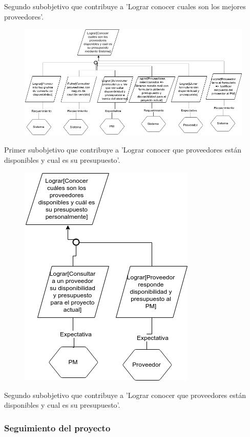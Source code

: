 Segundo subobjetivo que contribuye a 'Lograr conocer cuales son los mejores proveedores'.

\begin{figure}[H]
    \centering
    \includegraphics[width=\textwidth]{imagenes/objetivos-seleccion-mejor-proveedor-3.png}
\end{figure}

Primer subobjetivo que contribuye a 'Lograr conocer que proveedores están disponibles y cual es su presupuesto'.

\begin{figure}[H]
    \centering
    \includegraphics[width=.5\textwidth]{imagenes/objetivos-seleccion-mejor-proveedor-4.png}
\end{figure}

Segundo subobjetivo que contribuye a 'Lograr conocer que proveedores están disponibles y cual es su presupuesto'.

\subsubsection{Seguimiento del proyecto}

